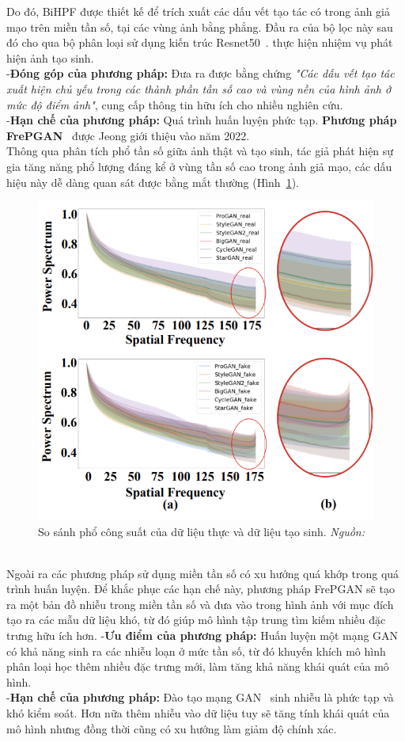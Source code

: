 Do đó, BiHPF được thiết kế để trích xuất các dấu vết tạo tác có trong ảnh giả mạo trên miền tần số, tại các vùng ảnh bằng phẳng. Đầu ra của bộ lọc này sau đó cho qua bộ phân loại sử dụng kiến trúc Resnet50~\cite{He2015DeepRL}. thực hiện nhiệm vụ phát hiện ảnh tạo sinh.\\
%
-\textbf{Đóng góp của phương pháp:}
Đưa ra được bằng chứng \textit{"Các dấu vết tạo tác xuất hiện chủ yếu trong các thành phần tần số cao và vùng nền của hình ảnh ở mức độ điểm ảnh"}, cung cấp thông tin hữu ích cho nhiều nghiên cứu.\\
%
-\textbf{Hạn chế của phương pháp:}
Quá trình huấn luyện phức tạp. 
%
\textbf{Phương pháp FrePGAN}~\cite{Jeong2022FrePGANRD} được Jeong giới thiệu vào năm 2022.\\
Thông qua phân tích phổ tần số giữa ảnh thật và tạo sinh, tác giả phát hiện sự gia tăng năng phổ lượng đáng kể ở vùng tần số cao trong ảnh giả mạo, các dấu hiệu này dễ dàng quan sát được bằng mắt thường (Hình~\ref{fig:freqgan-power-spectrum-1}).
%
\begin{figure}[h]
	\centering
	\includegraphics[width=0.7\linewidth]{Images/freqgan-power-spectrum-1.png}
	\begin{minipage}{0.9\linewidth}
		\caption{So sánh phổ công suất của dữ liệu thực và dữ liệu tạo sinh. \textit{Nguồn: \cite{Jeong2022FrePGANRD}}}
		\label{fig:freqgan-power-spectrum-1}
	\end{minipage}
\end{figure}\\
%
Ngoài ra các phương pháp sử dụng miền tần số có xu hướng quá khớp trong quá trình huấn luyện. Để khắc phục các hạn chế này, phương pháp FrePGAN sẽ tạo ra một bản đồ nhiễu trong miền tần số và đưa vào trong hình ảnh với mục đích tạo ra các mẫu dữ liệu khó, từ đó giúp mô hình tập trung tìm kiếm nhiều đặc trưng hữu ích hơn. 
%
-\textbf{Ưu điểm của phương pháp:} Huấn luyện một mạng GAN~\cite{Goodfellow2014GenerativeAN} có khả năng sinh ra các nhiễu loạn ở mức tần số, từ đó khuyến khích mô hình phân loại học thêm nhiều đặc trưng mới, làm tăng khả năng khái quát của mô hình.\\
-\textbf{Hạn chế của phương pháp:} Đào tạo mạng GAN~\cite{Goodfellow2014GenerativeAN} sinh nhiễu là phức tạp và khó kiểm soát. Hơn nữa thêm nhiễu vào dữ liệu tuy sẽ tăng tính khái quát của mô hình nhưng đồng thời cũng có xu hướng làm giảm độ chính xác.
%
%
%
